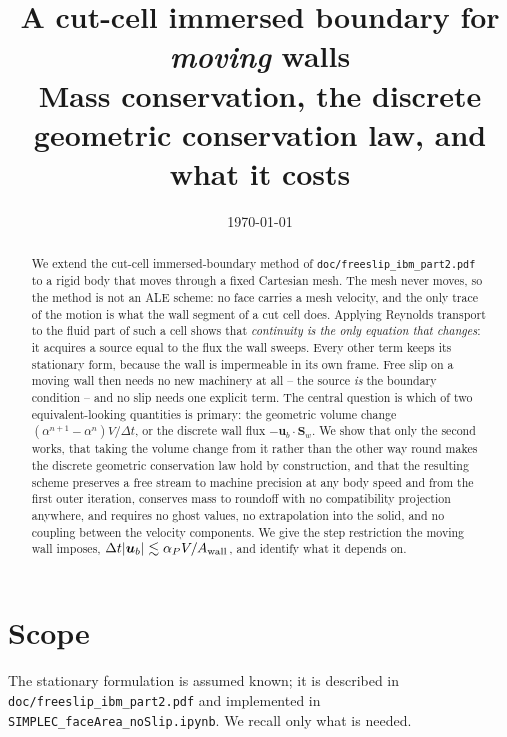 \documentclass[11pt,a4paper]{article}
\title{\bf A cut-cell immersed boundary for \emph{moving} walls\\
\large Mass conservation, the discrete geometric conservation law, and what it costs}
\author{}
\date{\today}
\theoremstyle{remark}
\newcommand{\uu}{\bm{u}}
\newcommand{\Sw}{\bm{S}_w}
\newcommand{\ub}{\uu_b}
\newcommand{\dt}{\Delta t}
\begin{document}
\maketitle

\begin{abstract}
We extend the cut-cell immersed-boundary method of \texttt{doc/freeslip\_ibm\_part2.pdf} to a
rigid body that moves through a fixed Cartesian mesh. The mesh never moves, so the method is not
an ALE scheme: no face carries a mesh velocity, and the only trace of the motion is what the
wall segment of a cut cell does. Applying Reynolds transport to the fluid part of such a cell
shows that \emph{continuity is the only equation that changes}: it acquires a source equal to the
flux the wall sweeps. Every other term keeps its stationary form, because the wall is
impermeable in its own frame. Free slip on a moving wall then needs no new machinery at all --
the source \emph{is} the boundary condition -- and no slip needs one explicit term.
The central question is which of two equivalent-looking quantities is primary: the geometric
volume change $(\alpha^{n+1}-\alpha^{n})V/\dt$, or the discrete wall flux
$-\ub\!\cdot\!\Sw$. We show that only the second works, that taking the volume change from it
rather than the other way round makes the discrete geometric conservation law hold by
construction, and that the resulting scheme preserves a free stream to machine precision at any
body speed and from the first outer iteration, conserves mass to roundoff with no compatibility
projection anywhere, and requires no ghost values, no extrapolation into the solid, and no
coupling between the velocity components. We give the step restriction the moving wall imposes,
$\dt|\ub|\lesssim\alpha_PV/A_{\rm wall}$, and identify what it depends on.
\end{abstract}

\tableofcontents

\section{Scope}

The stationary formulation is assumed known; it is described in
\texttt{doc/freeslip\_ibm\_part2.pdf} and implemented in
\texttt{SIMPLEC\_faceArea\_noSlip.ipynb}. We recall only what is needed.
\end{document}
